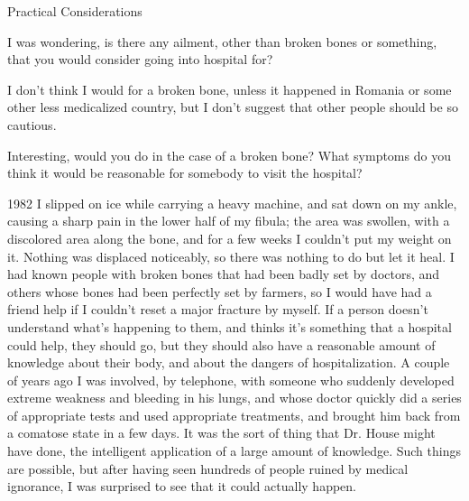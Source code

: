 \documentclass[11pt,oneside,openany,extrafontsizes]{memoir}
\begin{document}
\begin{emailexchange}{Practical Considerations}

    \begin{question}
         I was wondering, is there any ailment, other than broken bones or something, that you would consider going into hospital for?
    \end{question}

    \begin{answer}
       I don't think I would for a broken bone, unless it happened in Romania or some other less medicalized country, but I don't suggest that other people should be so cautious. 
    \end{answer}

    \begin{question}
        Interesting, would you do in the case of a broken bone? What symptoms do you think it would be reasonable for somebody to visit the hospital?
    \end{question}

    \begin{answer}
       1982 I slipped on ice while carrying a heavy machine, and sat down on my ankle, causing a sharp pain in the lower half of my fibula; the area was swollen, with a discolored area along the bone, and for a few weeks I couldn't put my weight on it. Nothing was displaced noticeably, so there was nothing to do but let it heal. I had known people with broken bones that had been badly set by doctors, and others whose bones had been perfectly set by farmers, so I would have had a friend help if I couldn't reset a major fracture by myself. If a person doesn't understand what's happening to them, and thinks it's something that a hospital could help, they should go, but they should also have a reasonable amount of knowledge about their body, and about the dangers of hospitalization. A couple of years ago I was involved, by telephone, with someone who suddenly developed extreme weakness and bleeding in his lungs, and whose doctor quickly did a series of appropriate tests and used appropriate treatments, and brought him back from a comatose state in a few days. It was the sort of thing that Dr. House might have done, the intelligent application of a large amount of knowledge. Such things are possible, but after having seen hundreds of people ruined by medical ignorance, I was surprised to see that it could actually happen.
    \end{answer}
\end{emailexchange}
\end{document}
